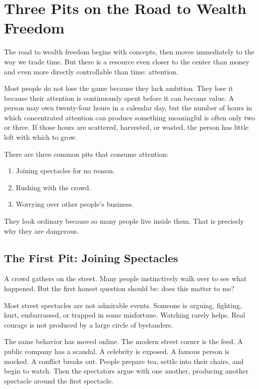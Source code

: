 \chapter{Three Pits on the Road to Wealth Freedom}

The road to wealth freedom begins with concepts, then moves immediately to the way we trade time. But there is a resource even closer to the center than money and even more directly controllable than time: attention.

Most people do not lose the game because they lack ambition. They lose it because their attention is continuously spent before it can become value. A person may own twenty-four hours in a calendar day, but the number of hours in which concentrated attention can produce something meaningful is often only two or three. If those hours are scattered, harvested, or wasted, the person has little left with which to grow.

There are three common pits that consume attention:

\begin{enumerate}
\item Joining spectacles for no reason.
\item Rushing with the crowd.
\item Worrying over other people's business.
\end{enumerate}

They look ordinary because so many people live inside them. That is precisely why they are dangerous.

\section*{The First Pit: Joining Spectacles}

A crowd gathers on the street. Many people instinctively walk over to see what happened. But the first honest question should be: does this matter to me?

Most street spectacles are not admirable events. Someone is arguing, fighting, hurt, embarrassed, or trapped in some misfortune. Watching rarely helps. Real courage is not produced by a large circle of bystanders.

The same behavior has moved online. The modern street corner is the feed. A public company has a scandal. A celebrity is exposed. A famous person is mocked. A conflict breaks out. People prepare tea, settle into their chairs, and begin to watch. Then the spectators argue with one another, producing another spectacle around the first spectacle.

